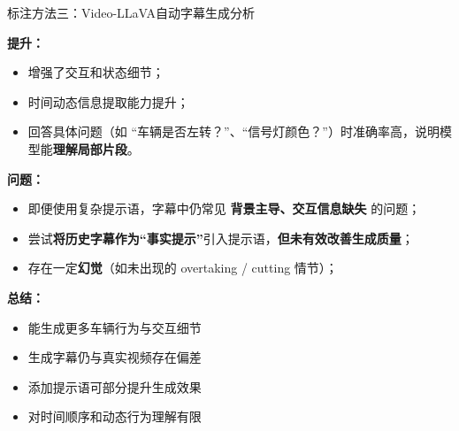\documentclass[serif]{beamer}
\begin{document}
\begin{frame}{标注方法三：Video-LLaVA自动字幕生成分析}


\textbf{提升：}
\begin{itemize}
  \item 增强了交互和状态细节；
  \item 时间动态信息提取能力提升；
  \item 回答具体问题（如 “车辆是否左转？”、“信号灯颜色？”）时准确率高，说明模型能\textbf{理解局部片段}。
\end{itemize}

\textbf{问题：}

\begin{itemize}
  \item 即便使用复杂提示语，字幕中仍常见 \textbf{背景主导、交互信息缺失} 的问题；
  \item 尝试\textbf{将历史字幕作为“事实提示”}引入提示语，\textbf{但未有效改善生成质量}；
  \item 存在一定\textbf{幻觉}（如未出现的 overtaking / cutting 情节）；
\end{itemize}

\vspace{0.3em}
\textbf{总结：}
\vspace{0.5em}

\begin{itemize}
  \item 能生成更多车辆行为与交互细节
  \item 生成字幕仍与真实视频存在偏差
  \item 添加提示语可部分提升生成效果
  \item 对时间顺序和动态行为理解有限
\end{itemize}
\end{frame}


\end{document}

